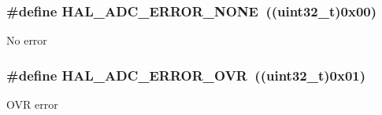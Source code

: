 \subsubsection[{\texorpdfstring{H\+A\+L\+\_\+\+A\+D\+C\+\_\+\+E\+R\+R\+O\+R\+\_\+\+N\+O\+NE}{HAL_ADC_ERROR_NONE}}]{\setlength{\rightskip}{0pt plus 5cm}\#define H\+A\+L\+\_\+\+A\+D\+C\+\_\+\+E\+R\+R\+O\+R\+\_\+\+N\+O\+NE~((uint32\+\_\+t)0x00)}\hypertarget{group___a_d_c___error___code_ga93b4576d46ee0f8c53b7d69f39778e38}{}\label{group___a_d_c___error___code_ga93b4576d46ee0f8c53b7d69f39778e38}
No error 
\subsubsection[{\texorpdfstring{H\+A\+L\+\_\+\+A\+D\+C\+\_\+\+E\+R\+R\+O\+R\+\_\+\+O\+VR}{HAL_ADC_ERROR_OVR}}]{\setlength{\rightskip}{0pt plus 5cm}\#define H\+A\+L\+\_\+\+A\+D\+C\+\_\+\+E\+R\+R\+O\+R\+\_\+\+O\+VR~((uint32\+\_\+t)0x01)}\hypertarget{group___a_d_c___error___code_ga30ce24556ebd3c0341558c700a3b9add}{}\label{group___a_d_c___error___code_ga30ce24556ebd3c0341558c700a3b9add}
O\+VR error 